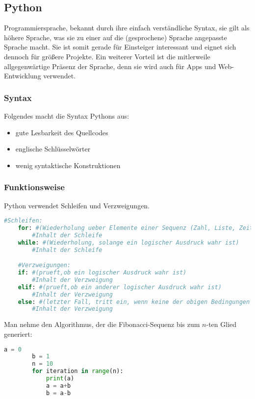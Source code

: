 \documentclass[main.tex]{subfiles}
\begin{document}
\subsection{Python}
Programmiersprache, bekannt durch ihre einfach verständliche Syntax, sie gilt als höhere Sprache, was sie zu einer auf die (gesprochene) Sprache angepasste Sprache macht. Sie ist somit gerade für Einsteiger interessant und eignet sich dennoch für größere Projekte. Ein weiterer Vorteil ist die mitlerweile allgegenwärtige Präsenz der Sprache, denn sie wird auch für Apps und Web-Entwicklung verwendet.

\subsubsection{Syntax}
Folgendes macht die Syntax Pythons aus:

\begin{itemize}
\item gute Lesbarkeit des Quellcodes
\item englische Schlüsselwörter
\item wenig syntaktische Konstruktionen
\end{itemize}

\subsubsection{Funktionsweise}
Python verwendet Schleifen und Verzweigungen.

\begin{lstlisting}[language=Python]
	#Schleifen:
	for: #(Wiederholung ueber Elemente einer Sequenz (Zahl, Liste, Zeit...))
		#Inhalt der Schleife
	while: #(Wiederholung, solange ein logischer Ausdruck wahr ist)
		#Inhalt der Schleife

	#Verzweigungen:
	if: #(prueft,ob ein logischer Ausdruck wahr ist)
		#Inhalt der Verzweigung
	elif: #(prueft,ob ein anderer logischer Ausdruck wahr ist)
		#Inhalt der Verzweigung
	else: #(letzter Fall, tritt ein, wenn keine der obigen Bedingungen erfuellt wurde)
		#Inhalt der Verzweigung
\end{lstlisting}
\begin{Beispiel}
	Man nehme den Algorithmus, der die Fibonacci-Sequenz bis zum $n$-ten Glied generiert:
	
	\begin{lstlisting}[language=Python]
		a = 0
		b = 1
		n = 10
		for iteration in range(n):
			print(a)
			a = a+b
			b = a-b
	\end{lstlisting}
\end{Beispiel}
\end{document}
